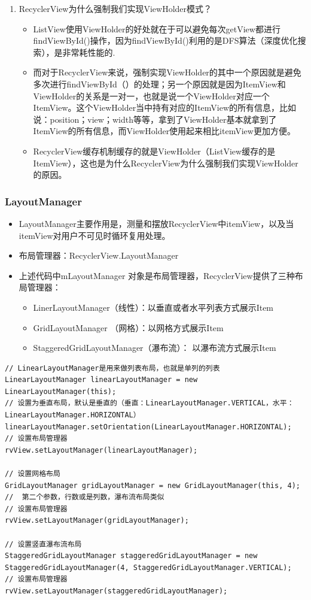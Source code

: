 \documentclass[9pt, b5paper]{article}
\begin{document}
\begin{enumerate}
\item RecyclerView为什么强制我们实现ViewHolder模式？
\label{sec-5-3-2-1}
\begin{itemize}
\item ListView使用ViewHolder的好处就在于可以避免每次getView都进行findViewById()操作，因为findViewById()利用的是DFS算法（深度优化搜索），是非常耗性能的.
\item 而对于RecyclerView来说，强制实现ViewHolder的其中一个原因就是避免多次进行findViewById（）的处理；另一个原因就是因为ItemView和ViewHolder的关系是一对一，也就是说一个ViewHolder对应一个ItemView。这个ViewHolder当中持有对应的ItemView的所有信息，比如说：position；view；width等等，拿到了ViewHolder基本就拿到了ItemView的所有信息，而ViewHolder使用起来相比itemView更加方便。
\item RecyclerView缓存机制缓存的就是ViewHolder（ListView缓存的是ItemView），这也是为什么RecyclerView为什么强制我们实现ViewHolder的原因。
\end{itemize}
\end{enumerate}

\subsubsection{LayoutManager}
\label{sec-5-3-3}
\begin{itemize}
\item LayoutManager主要作用是，测量和摆放RecyclerView中itemView，以及当itemView对用户不可见时循环复用处理。
\item 布局管理器：RecyclerView.LayoutManager
\item 上述代码中mLayoutManager 对象是布局管理器，RecyclerView提供了三种布局管理器：
\begin{itemize}
\item LinerLayoutManager（线性）：以垂直或者水平列表方式展示Item
\item GridLayoutManager （网格）：以网格方式展示Item
\item StaggeredGridLayoutManager（瀑布流）： 以瀑布流方式展示Item
\end{itemize}
\end{itemize}
\begin{verbatim}
// LinearLayoutManager是用来做列表布局，也就是单列的列表
LinearLayoutManager linearLayoutManager = new LinearLayoutManager(this);
// 设置为垂直布局，默认是垂直的（垂直：LinearLayoutManager.VERTICAL，水平：LinearLayoutManager.HORIZONTAL）
linearLayoutManager.setOrientation(LinearLayoutManager.HORIZONTAL);
// 设置布局管理器
rvView.setLayoutManager(linearLayoutManager);

// 设置网格布局
GridLayoutManager gridLayoutManager = new GridLayoutManager(this, 4); //  第二个参数，行数或是列数，瀑布流布局类似
// 设置布局管理器
rvView.setLayoutManager(gridLayoutManager);

// 设置竖直瀑布流布局
StaggeredGridLayoutManager staggeredGridLayoutManager = new StaggeredGridLayoutManager(4, StaggeredGridLayoutManager.VERTICAL);
// 设置布局管理器
rvView.setLayoutManager(staggeredGridLayoutManager);
\end{verbatim}
\end{document}
